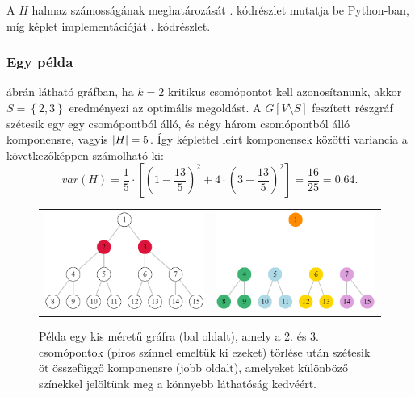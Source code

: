 A $H$ halmaz számosságának meghatározását . kódrészlet mutatja be Python-ban,
míg  képlet implementációját . kódrészlet.


\subsubsection{Egy példa}
 ábrán látható gráfban, ha $k = 2$ kritikus csomópontot kell azonosítanunk,
akkor $S = \left\{ 2, 3 \right\}$ eredményezi az optimális megoldást.
A $G\left[ V \setminus S \right]$ feszített részgráf szétesik egy egy csomópontból álló,
és négy három csomópontból álló komponensre, vagyis $\lvert H\rvert = 5$.
Így  képlettel leírt komponensek közötti variancia a következőképpen számolható ki:
\[
  var(H) = \dfrac{1}{5} \cdot \left[ \left( 1 - \dfrac{13}{5} \right)^{2} + 4 \cdot \left( 3 - \dfrac{13}{5} \right)^{2} \right] = \dfrac{16}{25} = 0.64.
\]


\begin{figure}[t]
  \centering
  \begin{tabular}{ll}
    \includegraphics[scale=0.38]{images/bocndp_before.png}
     &
    \includegraphics[scale=0.38]{images/bocndp_after.png}
  \end{tabular}
  \caption{
    Példa egy kis méretű gráfra (bal oldalt), amely a 2. és 3. csomópontok (piros színnel emeltük ki ezeket) törlése után
    szétesik öt összefüggő komponensre (jobb oldalt), amelyeket különböző színekkel jelöltünk meg a könnyebb láthatóság kedvéért.
  }
  \label{fig:BOCNDP_EXAMPLE}
\end{figure}


